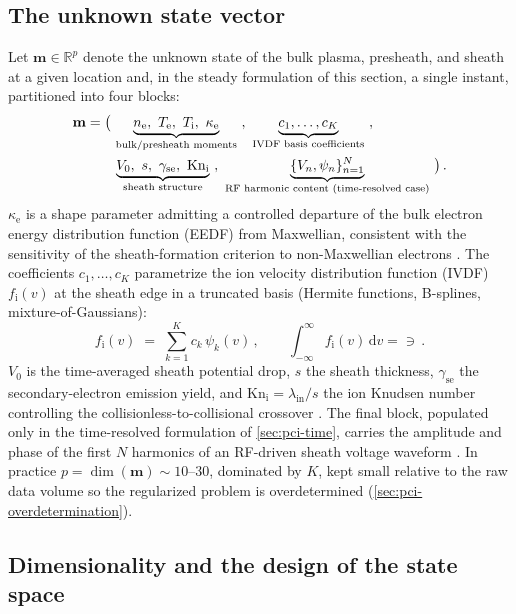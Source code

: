 \subsection{The unknown state vector}

Let $\mathbf{m}\in\mathbb{R}^{p}$ denote the unknown state of the bulk plasma, presheath, and sheath at a given location and, in the steady formulation of this section, a single instant, partitioned into four blocks:
\begin{align}
\mathbf{m} &= \big(\, \underbrace{\ne,\ \Te,\ \Ti,\ \kappa_{\mathrm e}}_{\text{bulk/presheath moments}}\ ,\ \underbrace{c_{1},\dots,c_{K}}_{\text{IVDF basis coefficients}}\ ,\notag\\
&\qquad \underbrace{V_{0},\ s,\ \gamma_{\mathrm{se}},\ \mathrm{Kn}_{\mathrm i}}_{\text{sheath structure}}\ ,\ \underbrace{\{V_{n},\psi_{n}\}_{n=1}^{N}}_{\text{RF harmonic content (time-resolved case)}} \,\big) \, . \label{eq:state}
\end{align}
$\kappa_{\mathrm e}$ is a shape parameter admitting a controlled departure of the bulk electron energy distribution function (EEDF) from Maxwellian, consistent with the sensitivity of the sheath-formation criterion to non-Maxwellian electrons \cite{ref0090}. The coefficients $c_{1},\dots,c_{K}$ parametrize the ion velocity distribution function (IVDF) $f_{\mathrm i}(v)$ at the sheath edge in a truncated basis (Hermite functions, B-splines, mixture-of-Gaussians):
\begin{equation}
f_{\mathrm i}(v) \;=\; \sum_{k=1}^{K} c_{k}\, \psi_{k}(v)\, , \qquad \int_{-\infty}^{\infty} f_{\mathrm i}(v)\,\mathrm dv = \ni \, . \label{eq:ivdf-basis}
\end{equation}
$V_{0}$ is the time-averaged sheath potential drop, $s$ the sheath thickness, $\gamma_{\mathrm{se}}$ the secondary-electron emission yield, and $\mathrm{Kn}_{\mathrm i}=\lambda_{\mathrm{in}}/s$ the ion Knudsen number controlling the collisionless-to-collisional crossover \cite{ref0077}. The final block, populated only in the time-resolved formulation of \cref{sec:pci-time}, carries the amplitude and phase of the first $N$ harmonics of an RF-driven sheath voltage waveform \cite{ref0043,ref0106}. In practice $p=\dim(\mathbf{m})\sim 10$--$30$, dominated by $K$, kept small relative to the raw data volume so the regularized problem is overdetermined (\cref{sec:pci-overdetermination}).

\subsection{Dimensionality and the design of the state space}

